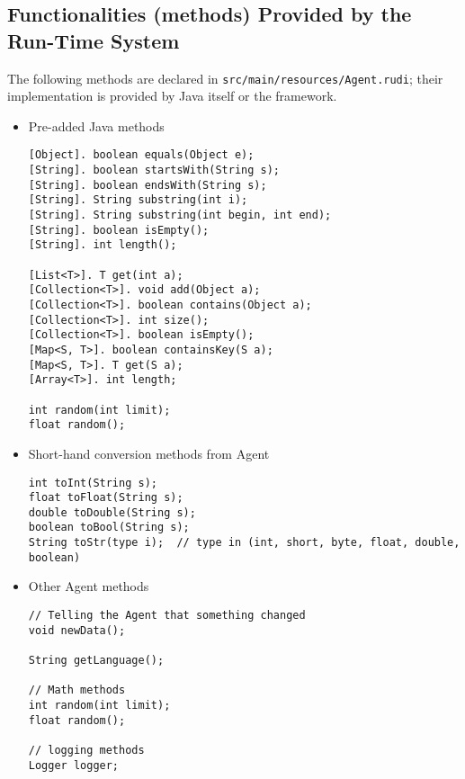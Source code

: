 \subsection{Functionalities (methods) Provided by the Run-Time System}
The following methods are declared in \texttt{src/main/resources/Agent.rudi}; their implementation is provided by Java itself or the \vonda framework.

\begin{itemize}
\item Pre-added Java methods
\begin{small}
\begin{lstlisting}
[Object]. boolean equals(Object e);
[String]. boolean startsWith(String s);
[String]. boolean endsWith(String s);
[String]. String substring(int i);
[String]. String substring(int begin, int end);
[String]. boolean isEmpty();
[String]. int length();

[List<T>]. T get(int a);
[Collection<T>]. void add(Object a);
[Collection<T>]. boolean contains(Object a);
[Collection<T>]. int size();
[Collection<T>]. boolean isEmpty();
[Map<S, T>]. boolean containsKey(S a);
[Map<S, T>]. T get(S a);
[Array<T>]. int length;

int random(int limit);
float random();
\end{lstlisting}
\end{small}

\item Short-hand conversion methods from Agent
\begin{small}
\begin{lstlisting}
int toInt(String s);
float toFloat(String s);
double toDouble(String s);
boolean toBool(String s);
String toStr(type i);  // type in (int, short, byte, float, double, boolean)
\end{lstlisting}
\end{small}

\item Other Agent methods
\begin{small}
\begin{lstlisting}
// Telling the Agent that something changed
void newData();

String getLanguage();

// Math methods
int random(int limit);
float random();

// logging methods
Logger logger;


\end{lstlisting}
\end{small}
\end{itemize}
